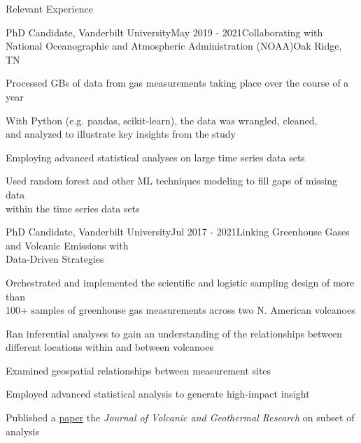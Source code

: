 \documentclass{resume} %
\begin{document}
\begin{rSection}{Relevant Experience}
\begin{rSubsection}{PhD Candidate, Vanderbilt University}{May 2019 - 2021}{Collaborating with National Oceanographic and Atmospheric Administration (NOAA)}{Oak Ridge, TN}
\item {Processed GBs of data from gas measurements taking place over the course of a year}
\item {With Python (e.g. pandas, scikit-learn), the data was wrangled, cleaned, \\ and analyzed to illustrate key insights from the study}
\item {Employing advanced statistical analyses on large time series data sets}
\item {Used random forest and other ML techniques modeling to fill gaps of missing data \\ within the time series data sets}

\end{rSubsection}


\begin{rSubsection}{PhD Candidate, Vanderbilt University}{Jul 2017 - 2021}{Linking Greenhouse Gases and Volcanic Emissions with \\ Data-Driven Strategies}{}
\item {Orchestrated and implemented the scientific and logistic sampling design of more than \\ 100+ samples of greenhouse gas measurements across two N. American volcanoes}
\item {Ran inferential analyses to gain an understanding of the relationships between \\ different locations within and between volcanoes}
\item {Examined geospatial relationships between measurement sites}
\item {Employed advanced statistical analysis to generate high-impact insight}
\item {Published a \href{https://www.sciencedirect.com/science/article/abs/pii/S0377027321000627#preview-section-abstract}{paper} the \emph{Journal of Volcanic and Geothermal Research} on subset of analysis}

\end{rSubsection}




\end{rSection}
\end{document}
